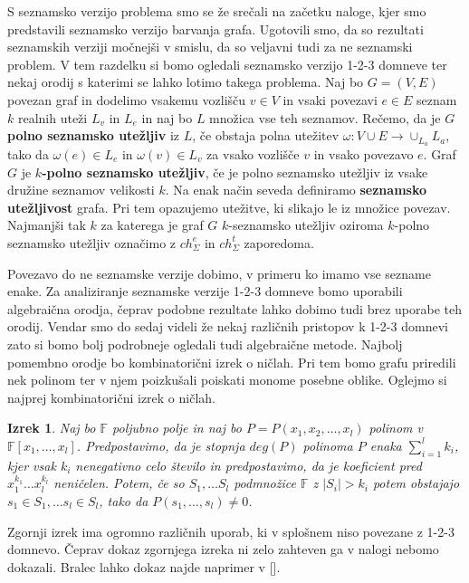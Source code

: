 \documentclass[12pt,a4paper,twoside]{article}
\theoremstyle{definition} %
\theoremstyle{plain} %
\newtheorem{izrek}[definicija]{Izrek}
\newcommand{\ecl}{ch_{\Sigma}^e}
\newcommand{\eclt}{ch_{\Sigma}^t}
\numberwithin{equation}{section}  %
\begin{document}
S seznamsko verzijo problema smo se že srečali na začetku naloge, kjer smo predstavili seznamsko verzijo barvanja grafa. Ugotovili smo, da so rezultati seznamskih verziji močnejši v smislu, da so veljavni tudi za ne seznamski problem. V tem razdelku si bomo ogledali seznamsko verzijo 1-2-3 domneve ter nekaj orodij s katerimi se lahko lotimo takega problema. Naj bo $G = (V, E)$ povezan graf in dodelimo vsakemu vozlišču $v \in V$ in vsaki povezavi $e \in E$ seznam $k$ realnih uteži $L_v$ in $L_e$ in naj bo $L$ množica vse teh seznamov. Rečemo, da je $G$ \textbf{polno seznamsko utežljiv} iz $L$, če obstaja polna utežitev $\omega : V \cup E \rightarrow \cup_{L_a} L_a$, tako da $\omega(e) \in L_e$ in $\omega(v) \in L_v$ za vsako vozlišče $v$ in vsako povezavo $e$. Graf $G$ je  \textbf{$k$-polno seznamsko utežljiv}, če je polno seznamsko utežljiv iz vsake družine seznamov velikosti $k$. Na enak način seveda definiramo \textbf{seznamsko utežljivost} grafa. Pri tem opazujemo utežitve, ki slikajo le iz množice povezav. Najmanjši tak $k$ za katerega je graf $G$ $k$-seznamsko utežljiv oziroma $k$-polno seznamsko utežljiv označimo z $\ecl$ in $\eclt$ zaporedoma.

Povezavo do ne seznamske verzije dobimo, v primeru ko imamo vse sezname enake. Za analiziranje seznamske verzije 1-2-3 domneve bomo uporabili algebraična orodja, čeprav podobne rezultate lahko dobimo tudi brez uporabe teh orodij. Vendar smo do sedaj videli že nekaj različnih pristopov k 1-2-3 domnevi zato si bomo bolj podrobneje ogledali tudi algebraične metode. Najbolj pomembno orodje bo kombinatorični izrek o ničlah. Pri tem bomo grafu priredili nek polinom ter v njem poizkušali poiskati  monome posebne oblike. Oglejmo si najprej kombinatorični izrek o ničlah.

\begin{izrek}
\label{zeros}
Naj bo $\mathbb{F}$ poljubno polje in naj bo $P = P(x_1, x_2, \ldots, x_l)$ polinom v $\mathbb{F}[x_1, \ldots, x_l]$. Predpostavimo, da je stopnja $deg(P)$ polinoma $P$ enaka $\sum_{i=1}^l k_i$, kjer vsak $k_i$ nenegativno celo število in predpostavimo, da je koeficient pred $x_1^{k_1} \ldots x_l^{k_l}$ neničelen. Potem, če so $S_1, \ldots S_l$ podmnožice $\mathbb{F}$ z $|S_i| > k_i $ potem obstajajo $s_1 \in S_1, \ldots s_l \in S_l$, tako da $P(s_1, \ldots, s_l) \neq 0$.
\end{izrek}

Zgornji izrek ima ogromno različnih uporab, ki v splošnem niso povezane z 1-2-3 domnevo. Čeprav dokaz zgornjega izreka ni zelo zahteven ga v nalogi nebomo dokazali. Bralec lahko dokaz najde naprimer v [].
\end{document}
